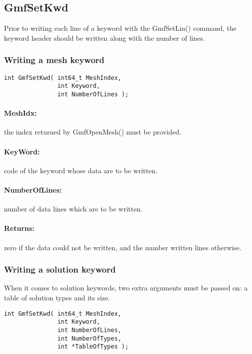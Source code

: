 \documentclass[a4paper,12pt]{article}
\begin{document}
\subsection{GmfSetKwd}
Prior to writing each line of a keyword with the GmfSetLin() command, the keyword header should be written along with the number of lines.

\subsubsection{Writing a mesh keyword}

\begin{tt}
\begin{verbatim}
int GmfSetKwd( int64_t MeshIndex,
               int Keyword,
               int NumberOfLines );
\end{verbatim}
\end{tt}
\normalfont

\paragraph{MeshIdx:}
the index returned by GmfOpenMesh() must be provided.

\paragraph{KeyWord:} code of the keyword whose data are to be written.

\paragraph{NumberOfLines:} number of data lines which are to be written.

\paragraph{Returns:} zero if the data could not be written, and the number written lines otherwise.

\subsubsection{Writing a solution keyword}
When it comes to solution keywords, two extra arguments must be passed on: a table of solution types and its size.

\begin{tt}
\begin{verbatim}
int GmfSetKwd( int64_t MeshIndex,
               int Keyword,
               int NumberOfLines,
               int NumberOfTypes,
               int *TableOfTypes );
\end{verbatim}
\end{tt}
\normalfont
\end{document}
